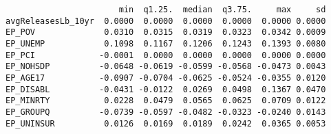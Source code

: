 \documentclass[
  12pt,
]{article}
\newenvironment{Shaded}{\begin{snugshade}}{\end{snugshade}}
\newcommand{\AttributeTok}[1]{\textcolor[rgb]{0.13,0.29,0.53}{#1}}
\newcommand{\CommentTok}[1]{\textcolor[rgb]{0.56,0.35,0.01}{\textit{#1}}}
\newcommand{\ConstantTok}[1]{\textcolor[rgb]{0.56,0.35,0.01}{#1}}
\newcommand{\ControlFlowTok}[1]{\textcolor[rgb]{0.13,0.29,0.53}{\textbf{#1}}}
\newcommand{\DecValTok}[1]{\textcolor[rgb]{0.00,0.00,0.81}{#1}}
\newcommand{\FloatTok}[1]{\textcolor[rgb]{0.00,0.00,0.81}{#1}}
\newcommand{\FunctionTok}[1]{\textcolor[rgb]{0.13,0.29,0.53}{\textbf{#1}}}
\newcommand{\NormalTok}[1]{#1}
\newcommand{\OtherTok}[1]{\textcolor[rgb]{0.56,0.35,0.01}{#1}}
\newcommand{\SpecialCharTok}[1]{\textcolor[rgb]{0.81,0.36,0.00}{\textbf{#1}}}
\begin{document}
\begin{Shaded}
\end{Shaded}

\begin{verbatim}
                       min  q1.25.  median  q3.75.     max     sd
avgReleasesLb_10yr  0.0000  0.0000  0.0000  0.0000  0.0000 0.0000
EP_POV              0.0310  0.0315  0.0319  0.0323  0.0342 0.0009
EP_UNEMP            0.1098  0.1167  0.1206  0.1243  0.1393 0.0080
EP_PCI             -0.0001  0.0000  0.0000  0.0000  0.0000 0.0000
EP_NOHSDP          -0.0648 -0.0619 -0.0599 -0.0568 -0.0473 0.0043
EP_AGE17           -0.0907 -0.0704 -0.0625 -0.0524 -0.0355 0.0120
EP_DISABL          -0.0431 -0.0122  0.0269  0.0498  0.1367 0.0470
EP_MINRTY           0.0228  0.0479  0.0565  0.0625  0.0709 0.0122
EP_GROUPQ          -0.0739 -0.0597 -0.0482 -0.0323 -0.0240 0.0143
EP_UNINSUR          0.0126  0.0169  0.0189  0.0242  0.0365 0.0053
\end{verbatim}
\end{document}
